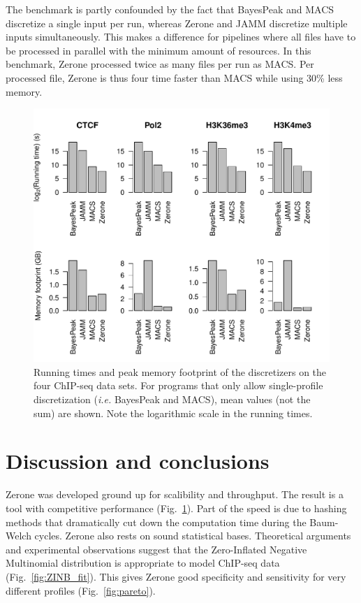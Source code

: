 \documentclass{bioinfo}
\begin{document}
The benchmark is partly confounded by the fact that BayesPeak and MACS
discretize a single input per run, whereas Zerone and JAMM discretize
multiple inputs simultaneously. This makes a difference for pipelines
where all files have to be processed in parallel with the minimum
amount of resources. In this benchmark, Zerone processed twice as
many files per run as MACS. Per processed file, Zerone is thus
four time faster than MACS while using 30\% less memory.

\begin{figure}[!tpb]
\centerline{\includegraphics[scale=0.5]{performance.pdf}}
\caption{
  Running times and peak memory footprint of the
  discretizers on the four ChIP-seq data sets. For programs that only
  allow single-profile discretization (\textit{i.e.} BayesPeak and MACS),
  mean values (not the sum) are shown. Note the logarithmic scale in the
  running times.
}\label{fig:perf}
\end{figure}

\section{Discussion and conclusions}
Zerone was developed ground up for scalibility and throughput.
The result is a tool with competitive performance (Fig.~\ref{fig:perf}).
Part of the speed is due to hashing methods that dramatically
cut down the computation time during the Baum-Welch cycles. Zerone
also rests on sound statistical bases. Theoretical arguments and
experimental observations suggest that the Zero-Inflated Negative
Multinomial distribution is appropriate to model ChIP-seq data
(Fig.~\ref{fig:ZINB_fit}). This gives Zerone good specificity
and sensitivity for very different profiles (Fig.~\ref{fig:pareto}).
\end{document}
